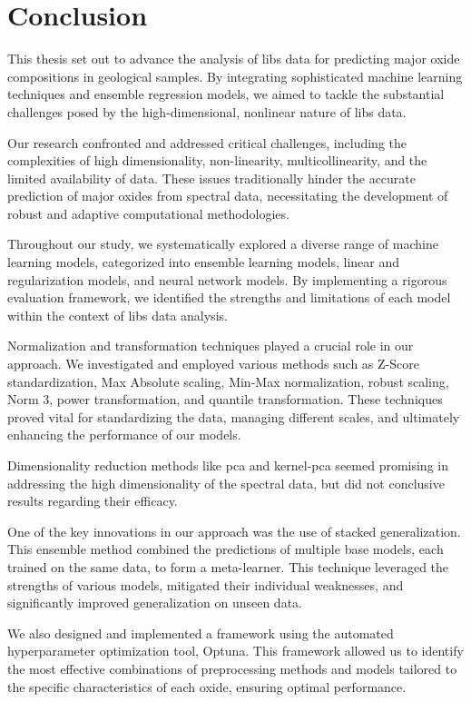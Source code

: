 \section{Conclusion}\label{sec:conclusion}
This thesis set out to advance the analysis of \gls{libs} data for predicting major oxide compositions in geological samples.
By integrating sophisticated machine learning techniques and ensemble regression models, we aimed to tackle the substantial challenges posed by the high-dimensional, nonlinear nature of \gls{libs} data.

Our research confronted and addressed critical challenges, including the complexities of high dimensionality, non-linearity, multicollinearity, and the limited availability of data.
These issues traditionally hinder the accurate prediction of major oxides from spectral data, necessitating the development of robust and adaptive computational methodologies.

Throughout our study, we systematically explored a diverse range of machine learning models, categorized into ensemble learning models, linear and regularization models, and neural network models.
By implementing a rigorous evaluation framework, we identified the strengths and limitations of each model within the context of \gls{libs} data analysis.

Normalization and transformation techniques played a crucial role in our approach.
We investigated and employed various methods such as Z-Score standardization, Max Absolute scaling, Min-Max normalization, robust scaling, Norm 3, power transformation, and quantile transformation.
These techniques proved vital for standardizing the data, managing different scales, and ultimately enhancing the performance of our models.

Dimensionality reduction methods like \gls{pca} and \gls{kernel-pca} seemed promising in addressing the high dimensionality of the spectral data, but did not conclusive results regarding their efficacy.

One of the key innovations in our approach was the use of stacked generalization.
This ensemble method combined the predictions of multiple base models, each trained on the same data, to form a meta-learner.
This technique leveraged the strengths of various models, mitigated their individual weaknesses, and significantly improved generalization on unseen data.

We also designed and implemented a framework using the automated hyperparameter optimization tool, Optuna.
This framework allowed us to identify the most effective combinations of preprocessing methods and models tailored to the specific characteristics of each oxide, ensuring optimal performance.

